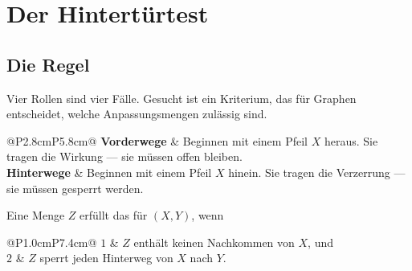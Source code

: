 \chapter{Der Hintertürtest}

\section{Die Regel}

\begin{merksatz}
Vier Rollen sind vier Fälle. Gesucht ist ein Kriterium, das für  Graphen entscheidet, welche Anpassungsmengen zulässig sind.

\begin{center}
{\small
\renewcommand{\arraystretch}{1.5}
\begin{tabular}{@{}P{2.8cm}P{5.8cm}@{}}
\toprule
\textbf{Vorderwege} & Beginnen mit einem Pfeil  $X$ heraus. Sie tragen die Wirkung --- sie müssen offen bleiben.\\
\textbf{Hinterwege} & Beginnen mit einem Pfeil  $X$ hinein. Sie tragen die Verzerrung --- sie müssen gesperrt werden.\\
\bottomrule
\end{tabular}}
\end{center}
\end{merksatz}

\begin{definition}
Eine Menge $Z$ erfüllt das  für $(X,Y)$, wenn
\begin{center}
{\small
\renewcommand{\arraystretch}{1.5}
\begin{tabular}{@{}P{1.0cm}P{7.4cm}@{}}
\toprule
$1$ & $Z$ enthält keinen Nachkommen von $X$, und\\
$2$ & $Z$ sperrt jeden Hinterweg von $X$ nach $Y$.\\
\bottomrule
\end{tabular}}
\end{center}
\end{definition}

